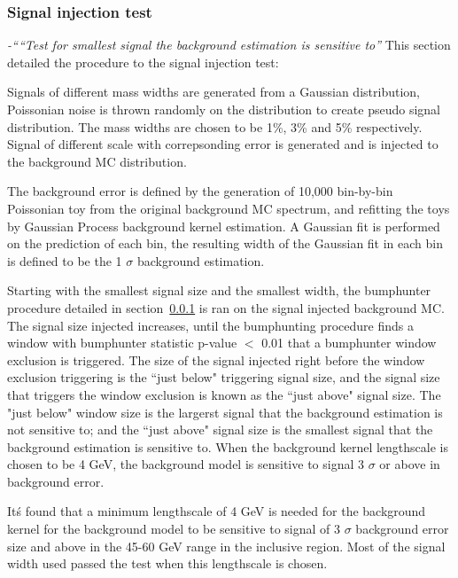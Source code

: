 \subsubsection{Signal injection test} 
\textit{-``“Test for smallest signal the background estimation is sensitive to”}
This section detailed the procedure to the signal injection test: 

Signals of different mass widths are generated from a Gaussian distribution, Poissonian noise is thrown randomly on the distribution to create pseudo signal distribution. The mass widths are chosen to be 1\%, 3\% and 5\% respectively. Signal of different scale with correpsonding error is generated and is injected to the background MC distribution.

The background error is defined by the generation of 10,000 bin-by-bin Poissonian toy from the original background MC spectrum, and refitting the toys by Gaussian Process background kernel estimation. A Gaussian fit is performed on the prediction of each bin, the resulting width of the Gaussian fit in each bin is defined to be the 1 $\sigma$ background estimation. 

Starting with the smallest signal size and the smallest width, the bumphunter procedure detailed in section~\ref{} is ran on the signal injected background MC. The signal size injected increases, until the bumphunting procedure finds a window with bumphunter statistic p-value $<$ 0.01 that a bumphunter window exclusion is triggered. The size of the signal injected right before the window exclusion triggering is the ``just below"
triggering signal size, and the signal size that triggers the window exclusion is known as the ``just above" signal size. The "just below"
window size is the largerst signal that the background estimation is not sensitive to; and the ``just above" signal size is the smallest signal that the background estimation is sensitive to. When the background kernel lengthscale is chosen to be 4 GeV, the background model is sensitive to signal 3 $\sigma$ or above in background error. 

It\'s found that a minimum lengthscale of 4 GeV is needed for the background kernel for the background model to be sensitive to signal of 3 $\sigma$ background error size and above in the 45-60 GeV range in the inclusive region. Most of the signal width used passed the test when this lengthscale is chosen. 

